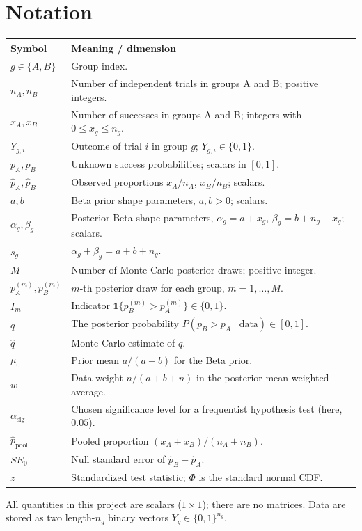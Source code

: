 \documentclass[11pt]{article}
\begin{document}
\section{Notation}
\begin{longtable}{l p{}}
\toprule
\textbf{Symbol} & \textbf{Meaning / dimension}\\
\midrule
\endhead
$g\in\{A,B\}$ & Group index.\\
$n_A,n_B$ & Number of independent trials in groups A and B; positive integers.\\
$x_A,x_B$ & Number of successes in groups A and B; integers with $0\le x_g\le n_g$.\\
$Y_{g,i}$ & Outcome of trial $i$ in group $g$; $Y_{g,i}\in\{0,1\}$.\\
$p_A,p_B$ & Unknown success probabilities; scalars in $[0,1]$.\\
$\hat p_A,\hat p_B$ & Observed proportions $x_A/n_A$, $x_B/n_B$; scalars.\\
$a,b$ & Beta prior shape parameters, $a,b>0$; scalars.\\
$\alpha_g,\beta_g$ & Posterior Beta shape parameters, $\alpha_g=a+x_g$, $\beta_g=b+n_g-x_g$; scalars.\\
$s_g$ & $\alpha_g+\beta_g=a+b+n_g$.\\
$M$ & Number of Monte Carlo posterior draws; positive integer.\\
$p_A^{(m)},p_B^{(m)}$ & $m$-th posterior draw for each group, $m=1,\dots,M$.\\
$I_m$ & Indicator $\mathbb 1\{p_B^{(m)}>p_A^{(m)}\}\in\{0,1\}$.\\
$q$ & The posterior probability $P(p_B>p_A\mid\text{data})\in[0,1]$.\\
$\hat q$ & Monte Carlo estimate of $q$.\\
$\mu_0$ & Prior mean $a/(a+b)$ for the Beta prior.\\
$w$ & Data weight $n/(a+b+n)$ in the posterior-mean weighted average.\\
$\alpha_{\mathrm{sig}}$ & Chosen significance level for a frequentist hypothesis test (here, $0.05$).\\
$\hat p_{\mathrm{pool}}$ & Pooled proportion $(x_A+x_B)/(n_A+n_B)$.\\
$SE_0$ & Null standard error of $\hat p_B-\hat p_A$.\\
$z$ & Standardized test statistic; $\Phi$ is the standard normal CDF.\\
\bottomrule
\end{longtable}
All quantities in this project are scalars ($1\times1$); there are no matrices. Data are stored as two length-$n_g$ binary vectors $Y_g\in\{0,1\}^{n_g}$.
\end{document}
